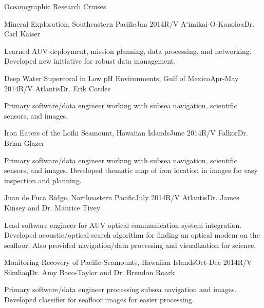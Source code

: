 \documentclass{resume} %
\begin{document}
\begin{rSection}{Oceanographic Research Cruises}

\begin{rSubsection}{Mineral Exploration, Southeastern Pacific}{Jan 2014}{R/V A`imikai-O-Kanoloa}{Dr. Carl Kaiser}
\item{Learned AUV deployment, mission planning, data processing, and networking. Developed new initiative for robust data management.}
\end{rSubsection}


\begin{rSubsection}{Deep Water Supercoral in Low pH Environments, Gulf of Mexico}{Apr-May 2014}{R/V Atlantis}{Dr. Erik Cordes}
\item{Primary software/data engineer working with subsea navigation, scientific sensors, and images.}
\end{rSubsection}

\begin{rSubsection}{Iron Eaters of the Loihi Seamount, Hawaiian Islands}{June 2014}{R/V Falkor}{Dr. Brian Glazer}
\item{Primary software/data engineer working with subsea navigation, scientific sensors, and images. Developed thematic map of iron location in images for easy inspection and planning. }
\end{rSubsection}


\begin{rSubsection}{Juan de Fuca Ridge, Northeastern Pacific}{July 2014}{R/V Atlantis}{Dr. James Kinsey and Dr. Maurice Tivey}
\item{Lead software engineer for AUV optical communication system integration. Developed acoustic/optical search algorithm for finding an optical modem on the seafloor. Also provided navigation/data processing and visualization for science.}
\end{rSubsection}


\begin{rSubsection}{Monitoring Recovery of Pacific Seamounts, Hawaiian Islands}{Oct-Dec 2014}{R/V Sikuliaq}{Dr. Amy Baco-Taylor and Dr. Brendon Roark}
\item{Primary software/data engineer processing subsea navigation and images. Developed classifier for seafloor images for easier processing.}
\end{rSubsection}



\end{rSection}
\end{document}
